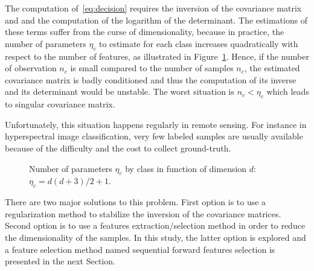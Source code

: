 \documentclass[journal,peerreview,onecolumn]{IEEEtran}
\begin{document}
    The computation of~\ref{eq:decision} requires the inversion of the
    covariance matrix and and the  computation of the logarithm of the
    determinant.  The estimations of these terms suffer from the curse
    of  dimensionality\cite{bouveyron2014model}, because  in practice,
    the  number of  parameters  $\eta_c$ to  estimate  for each  class
    increases quadratically with respect to the number of features, as
    illustrated in Figure~\ref{fig:nb-param}.  Hence, if the number of
    observation  $n_c$ is  small  compared to  the  number of  samples
    $n_c$, the  estimated covariance  matrix is badly  conditioned and
    thus the computation  of its inverse and its  determinant would be
    unstable.  The  worst situation  is  $n_c<\eta_c$  which leads  to
    singular covariance matrix.

    Unfortunately, this situation happens regularly in remote sensing.
    For  instance  in  hyperspectral image  classification,  very  few
    labeled samples  are usually  available because of  the difficulty
    and the cost to collect ground-truth.

    \begin{figure}[!t] %
        \centering
        \caption{Number of parameters $\eta_c$ by class in function of dimension $d$: $\eta_c=d(d+3)/2+1$.\label{fig:nb-param}}
    \end{figure}

    There are two major  solutions to this problem. First
    option  is  to  use  a  regularization  method  to  stabilize  the
    inversion of the  covariance matrices\cite{hoerl1970ridge}. Second
    option is to  use a features extraction/selection  method in order
    to reduce  the dimensionality of  the samples. In this  study, the
    latter option  is explored  and a  feature selection  method named
    sequential  forward features  selection is  presented in  the next
    Section.
\end{document}
